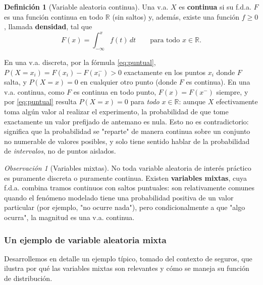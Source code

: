 \documentclass[11pt,a4paper]{article}
\theoremstyle{plain}
\theoremstyle{definition}
\newtheorem{definicion}[teorema]{Definición}
\theoremstyle{remark}
\newtheorem{observacion}[teorema]{Observación}
\begin{document}
\begin{definicion}[Variable aleatoria continua]
Una v.a. $X$ es \textbf{continua} si su f.d.a. $F$ es una función continua en todo $\mathbb{R}$ (sin saltos) y, además, existe una función $f\ge0$, llamada \textbf{densidad}, tal que
$$F(x)=\int_{-\infty}^x f(t)\,dt \qquad \text{para todo } x\in\mathbb{R}.$$
\end{definicion}

En una v.a. discreta, por la fórmula \eqref{eq:puntual}, $P(X=x_i)=F(x_i)-F(x_i^-)>0$ exactamente en los puntos $x_i$ donde $F$ salta, y $P(X=x)=0$ en cualquier otro punto (donde $F$ es continua). En una v.a. continua, como $F$ es continua en todo punto, $F(x)=F(x^-)$ siempre, y por \eqref{eq:puntual} resulta $P(X=x)=0$ para \emph{todo} $x\in\mathbb{R}$: aunque $X$ efectivamente toma algún valor al realizar el experimento, la probabilidad de que tome exactamente un valor prefijado de antemano es nula. Esto no es contradictorio: significa que la probabilidad se "reparte" de manera continua sobre un conjunto no numerable de valores posibles, y solo tiene sentido hablar de la probabilidad de \emph{intervalos}, no de puntos aislados.

\begin{observacion}[Variables mixtas]
No toda variable aleatoria de interés práctico es puramente discreta o puramente continua. Existen \textbf{variables mixtas}, cuya f.d.a. combina tramos continuos con saltos puntuales: son relativamente comunes quando el fenómeno modelado tiene una probabilidad positiva de un valor particular (por ejemplo, "no ocurre nada"), pero condicionalmente a que "algo ocurra", la magnitud es una v.a. continua.
\end{observacion}

\subsubsection{Un ejemplo de variable aleatoria mixta}

Desarrollemos en detalle un ejemplo típico, tomado del contexto de seguros, que ilustra por qué las variables mixtas son relevantes y cómo se maneja su función de distribución.
\end{document}
